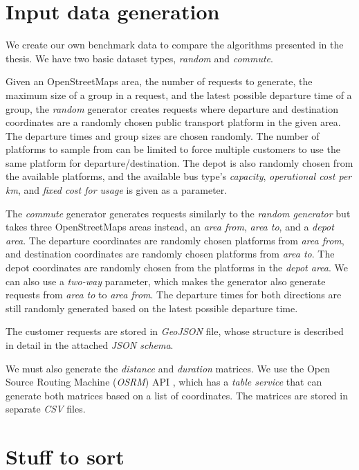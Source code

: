 \section{Input data generation}

We create our own benchmark data to compare the algorithms presented in the thesis. We have two basic dataset types, \textit{random} and \textit{commute}.

Given an OpenStreetMaps area, the number of requests to generate, the maximum size of a group in a request, and the latest possible departure time of a group, the \textit{random} generator creates requests where departure and destination coordinates are a randomly chosen public transport platform in the given area. The departure times and group sizes are chosen randomly. The number of platforms to sample from can be limited to force multiple customers to use the same platform for departure/destination. The depot is also randomly chosen from the available platforms, and the available bus type's \textit{capacity}, \textit{operational cost per km}, and \textit{fixed cost for usage} is given as a parameter.

The \textit{commute} generator generates requests similarly to the \textit{random generator} but takes three OpenStreetMaps areas instead, an \textit{area from}, \textit{area to}, and a \textit{depot area}. The departure coordinates are randomly chosen platforms from \textit{area from}, and destination coordinates are randomly chosen platforms from \textit{area to}. The depot coordinates are randomly chosen from the platforms in the \textit{depot area}. We can also use a \textit{two-way} parameter, which makes the generator also generate requests from \textit{area to} to \textit{area from}. The departure times for both directions are still randomly generated based on the latest possible departure time.

The customer requests are stored in \textit{GeoJSON} file, whose structure is described in detail in the attached \textit{JSON schema}.

We must also generate the \textit{distance} and \textit{duration} matrices. We use the Open Source Routing Machine (\textit{OSRM}) API \cite{luxen-vetter-2011}, which has a \textit{table service} that can generate both matrices based on a list of coordinates. The matrices are stored in separate \textit{CSV} files.

\iffalse

\section{Stuff to sort}

